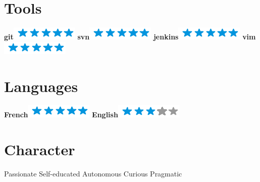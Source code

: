 \documentclass[]{friggeri-cv}
\begin{document}
\begin{aside}
    \section{Tools}
        \textbf{git}\includegraphics[scale=0.40]{img/5stars.png}
        \textbf{svn}\includegraphics[scale=0.40]{img/5stars.png}
        \textbf{jenkins}\includegraphics[scale=0.40]{img/5stars.png}
        \textbf{vim}\includegraphics[scale=0.40]{img/5stars.png}
        ~
    \section{Languages}
        \textbf{French}\includegraphics[scale=0.40]{img/5stars.png}
        \textbf{English}\includegraphics[scale=0.40]{img/3stars.png}
        ~
    \section{Character}
        Passionate
        Self-educated
        Autonomous
        Curious
        Pragmatic
        ~
\end{aside}

\newpage
\end{document}
